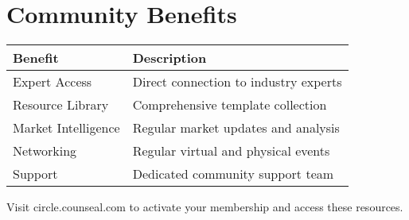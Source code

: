 \section{Community Benefits}
\begin{center}
    \begin{tabular}{p{}|p{}}
        \textbf{Benefit}    & \textbf{Description}                  \\
        \hline
        Expert Access       & Direct connection to industry experts \\
        Resource Library    & Comprehensive template collection     \\
        Market Intelligence & Regular market updates and analysis   \\
        Networking          & Regular virtual and physical events   \\
        Support             & Dedicated community support team      \\
    \end{tabular}
\end{center}

\begin{importantbox}
    Visit circle.counseal.com to activate your membership and access these resources.
\end{importantbox}